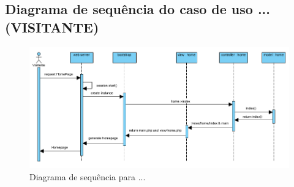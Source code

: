 \subsection{Diagrama de sequência do caso de uso ...(VISITANTE)}



\begin{figure}[!htb]
	\centering
	\includegraphics[width=\textwidth]{figuras/sequence_diagram_visitante.png}
	\caption{Diagrama de sequência para ...}
	\label{fig:sequência_visitamte}
\end{figure}